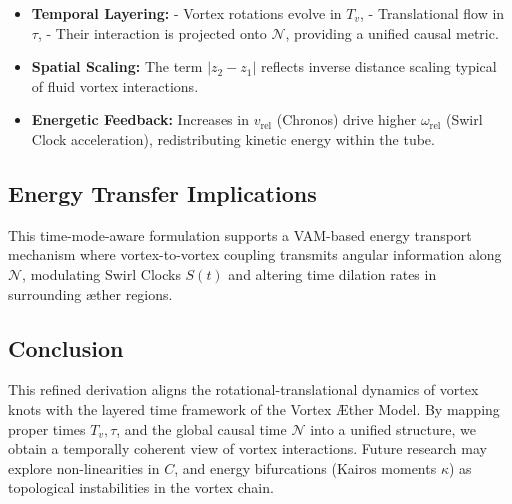 \documentclass[12pt]{article}
\begin{document}
    \begin{itemize}
        \item \textbf{Temporal Layering:}
        - Vortex rotations evolve in \( T_v \),
        - Translational flow in \( \tau \),
        - Their interaction is projected onto \( \mathcal{N} \), providing a unified causal metric.

        \item \textbf{Spatial Scaling:} The term \( |z_2 - z_1| \) reflects inverse distance scaling typical of fluid vortex interactions.

        \item \textbf{Energetic Feedback:} Increases in \( v_\text{rel} \) (Chronos) drive higher \( \omega_\text{rel} \) (Swirl Clock acceleration), redistributing kinetic energy within the tube.
    \end{itemize}

    \subsection*{Energy Transfer Implications}

    This time-mode-aware formulation supports a VAM-based energy transport mechanism where vortex-to-vortex coupling transmits angular information along \( \mathcal{N} \), modulating Swirl Clocks \( S(t) \) and altering time dilation rates in surrounding æther regions.

    \subsection*{Conclusion}

    This refined derivation aligns the rotational-translational dynamics of vortex knots with the layered time framework of the Vortex Æther Model. By mapping proper times \( T_v, \tau \), and the global causal time \( \mathcal{N} \) into a unified structure, we obtain a temporally coherent view of vortex interactions. Future research may explore non-linearities in \( C \), and energy bifurcations (Kairos moments \( \kappa \)) as topological instabilities in the vortex chain.



    \ifdefined\standalonechapter
    \else
    
    
    
\end{document}
